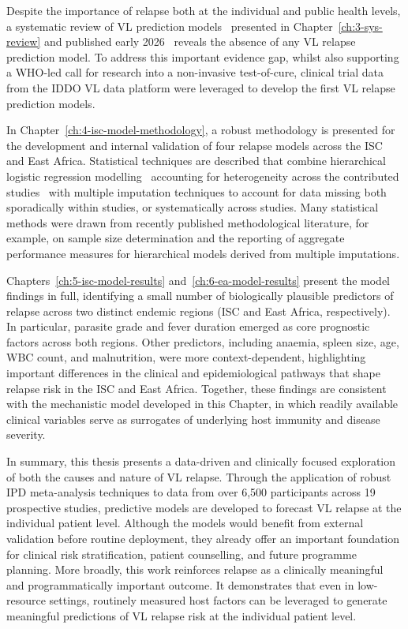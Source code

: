 Despite the importance of relapse both at the individual and public health levels, a systematic review of VL prediction models \textemdash\ presented in Chapter~\ref{ch:3-sys-review} and published early 2026\cite{wilson2026} \textemdash\ reveals the absence of any VL relapse prediction model. To address this important evidence gap, whilst also supporting a WHO-led call for research into a non-invasive test-of-cure\cite{WHO2024_Leishmaniasis}, clinical trial data from the IDDO VL data platform were leveraged to develop the first VL relapse prediction models.

In Chapter~\ref{ch:4-isc-model-methodology}, a robust methodology is presented for the development and internal validation of four relapse models across the ISC and East Africa. Statistical techniques are described that combine hierarchical logistic regression modelling \textemdash\ accounting for heterogeneity across the contributed studies \textemdash\ with multiple imputation techniques to account for data missing both sporadically within studies, or systematically across studies. Many statistical methods were drawn from recently published methodological literature, for example, on sample size determination and the reporting of aggregate performance measures for hierarchical models derived from multiple imputations.

Chapters~\ref{ch:5-isc-model-results} and~\ref{ch:6-ea-model-results} present the model findings in full, identifying a small number of biologically plausible predictors of relapse across two distinct endemic regions (ISC and East Africa, respectively). In particular, parasite grade and fever duration emerged as core prognostic factors across both regions. Other predictors, including anaemia, spleen size, age, WBC count, and malnutrition, were more context-dependent, highlighting important differences in the clinical and epidemiological pathways that shape relapse risk in the ISC and East Africa. Together, these findings are consistent with the mechanistic model developed in this Chapter, in which readily available clinical variables serve as surrogates of underlying host immunity and disease severity.

In summary, this thesis presents a data-driven and clinically focused exploration of both the causes and nature of VL relapse. Through the application of robust IPD meta-analysis techniques to data from over 6,500 participants across 19 prospective studies, predictive models are developed to forecast VL relapse at the individual patient level. Although the models would benefit from external validation before routine deployment, they already offer an important foundation for clinical risk stratification, patient counselling, and future programme planning. More broadly, this work reinforces relapse as a clinically meaningful and programmatically important outcome. It demonstrates that even in low-resource settings, routinely measured host factors can be leveraged to generate meaningful predictions of VL relapse risk at the individual patient level.